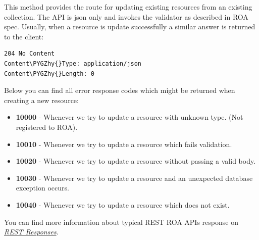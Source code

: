 \documentclass[letterpaper,10pt,english]{sphinxmanual}
\def\PYGZhy{\char`\-}
\begin{document}
\begin{fulllineitems}
\begin{fulllineitems}
\end{fulllineitems}


\begin{fulllineitems}
\label{features/roa/technical_summary:fantastico.contrib.roa_discovery.roa_controller.RoaController.update_item}
This method provides the route for updating existing resources from an existing collection.
The API is json only and invokes the validator as described in ROA spec.
Usually, when a resource is update successfully a similar answer is returned to the client:

\begin{Verbatim}[commandchars=\\\{\}]
204 No Content
Content\PYGZhy{}Type: application/json
Content\PYGZhy{}Length: 0
\end{Verbatim}

Below you can find all error response codes which might be returned when creating a new resource:
\begin{itemize}
\item {} 
\textbf{10000} - Whenever we try to update a resource with unknown type. (Not registered to ROA).

\item {} 
\textbf{10010} - Whenever we try to update a resource which fails validation.

\item {} 
\textbf{10020} - Whenever we try to update a resource without passing a valid body.

\item {} 
\textbf{10030} - Whenever we try to update a resource and an unexpected database exception occurs.

\item {} 
\textbf{10040} - Whenever we try to update a resource which does not exist.

\end{itemize}

You can find more information about typical REST ROA APIs response on {\hyperref[features/roa/rest_responses::doc]{\emph{REST Responses}}}.

\end{fulllineitems}



\end{fulllineitems}
\end{document}
